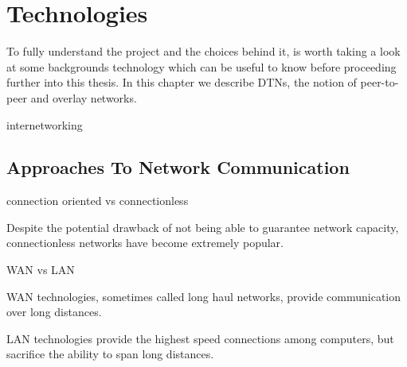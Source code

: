 
\chapter{Technologies}\label{chapter:technologies}













































To fully understand the project and the choices behind it, is worth taking a look at some backgrounds technology which can be useful to know before proceeding further into this thesis.
In this chapter we describe DTNs, the notion of peer-to-peer and overlay networks.

internetworking \cite{internetworking}

\section{Approaches To Network Communication}

connection oriented vs connectionless

Despite the potential drawback of not being able to guarantee network capacity,
connectionless networks have become extremely popular.

WAN vs LAN

WAN technologies, sometimes called long haul networks, provide communication
over long distances.

LAN technologies provide the highest speed connections among computers, but
sacrifice the ability to span long distances.


